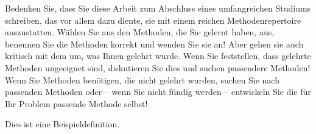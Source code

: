 Bedenken Sie, dass Sie diese Arbeit zum Abschluss eines umfangreichen Studiums schreiben, das vor allem dazu diente, sie mit einem reichen Methodenrepertoire auszustatten.
Wählen Sie aus den Methoden, die Sie gelernt haben, aus, benennen Sie die Methoden korrekt und wenden Sie sie an! Aber gehen sie auch kritisch mit dem um, was Ihnen gelehrt wurde.
Wenn Sie feststellen, dass gelehrte Methoden ungeeignet sind, diskutieren Sie dies und suchen passendere Methoden! Wenn Sie Methoden benötigen, die nicht gelehrt wurden, suchen Sie nach passenden Methoden oder -- wenn Sie nicht fündig werden -- entwickeln Sie die für Ihr Problem passende Methode selbst!

\begin{definition}[Beispieldefinition]
Dies ist eine Beispieldefinition.
\end{definition}
